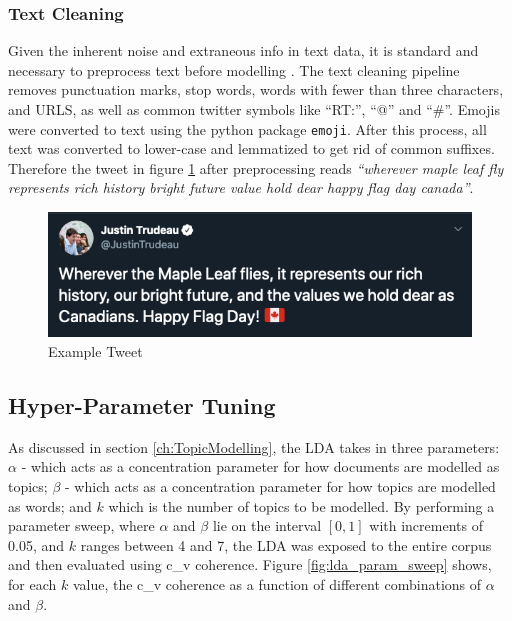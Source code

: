 \subsubsection{Text Cleaning}

Given the inherent noise and extraneous info in text data, it is standard and
necessary to preprocess text before modelling \cite{sapul2017trending}. The text
cleaning pipeline removes punctuation marks, stop words, words with fewer than
three characters, and URLS, as well as common twitter symbols like ``RT:'',
``@'' and ``\#''. Emojis were converted to text using the python package
\texttt{emoji}. After this process, all text was converted to lower-case and
lemmatized to get rid of common suffixes. Therefore the tweet in figure
\ref{fig:tweet_ex} after preprocessing reads \emph{``wherever maple leaf fly
represents rich history bright future value hold dear happy flag day canada''}.

\begin{singlespacing}
    \begin{figure}[H]
    \centering
    \includegraphics[scale=0.55]{Figures/tweet_ex}
    \caption[Example Tweet]{Example Tweet}
    \label{fig:tweet_ex}
    \end{figure}
\end{singlespacing}

\subsection{Hyper-Parameter Tuning}\label{sec:TopicModellingHP}

As discussed in section \ref{ch:TopicModelling}, the LDA takes in three
parameters: $\alpha$ - which acts as a concentration parameter for how documents
are modelled as topics; $\beta$ - which acts as a concentration parameter for
how topics are modelled as words; and $k$ which is the number of topics to be
modelled. By performing a parameter sweep, where $\alpha$ and $\beta$ lie on the
interval $\left[0,1\right]$ with increments of 0.05, and $k$ ranges between 4
and 7, the LDA was exposed to the entire corpus and then evaluated using c\_v
coherence. Figure \ref{fig:lda_param_sweep} shows, for each $k$ value, the c\_v
coherence as a function of different combinations of $\alpha$ and $\beta$.

